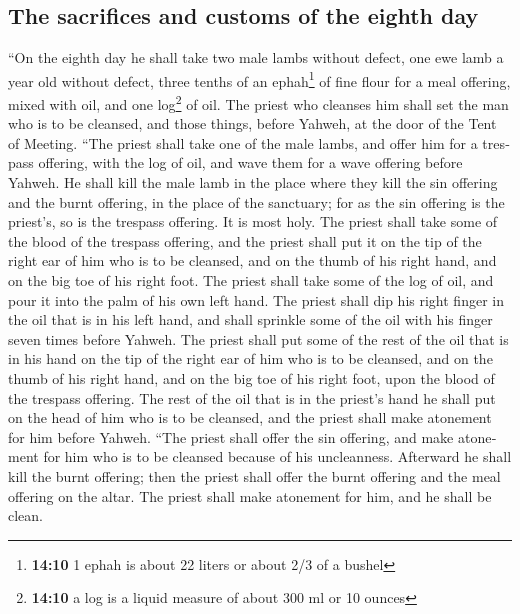 \begin{paracol}{2}
\begin{otherlanguage}{english}
\hypertarget{the-sacrifices-and-customs-of-the-eighth-day}{%
\subsection{The sacrifices and customs of the eighth
day}\label{the-sacrifices-and-customs-of-the-eighth-day}}

 ``On the eighth day he shall take two male lambs without
defect, one ewe lamb a year old without defect, three tenths of an
ephah\footnote{\textbf{14:10} 1 ephah is about 22 liters or about 2/3 of
  a bushel} of fine flour for a meal offering, mixed with oil, and one
log\footnote{\textbf{14:10} a log is a liquid measure of about 300 ml or
  10 ounces} of oil.  The priest who cleanses him shall
set the man who is to be cleansed, and those things, before Yahweh, at
the door of the Tent of Meeting.  ``The priest shall take
one of the male lambs, and offer him for a trespass offering, with the
log of oil, and wave them for a wave offering before Yahweh.
 He shall kill the male lamb in the place where they kill
the sin offering and the burnt offering, in the place of the sanctuary;
for as the sin offering is the priest's, so is the trespass offering. It
is most holy.  The priest shall take some of the blood of
the trespass offering, and the priest shall put it on the tip of the
right ear of him who is to be cleansed, and on the thumb of his right
hand, and on the big toe of his right foot.  The priest
shall take some of the log of oil, and pour it into the palm of his own
left hand.  The priest shall dip his right finger in the
oil that is in his left hand, and shall sprinkle some of the oil with
his finger seven times before Yahweh.  The priest shall
put some of the rest of the oil that is in his hand on the tip of the
right ear of him who is to be cleansed, and on the thumb of his right
hand, and on the big toe of his right foot, upon the blood of the
trespass offering.  The rest of the oil that is in the
priest's hand he shall put on the head of him who is to be cleansed, and
the priest shall make atonement for him before Yahweh. 
``The priest shall offer the sin offering, and make atonement for him
who is to be cleansed because of his uncleanness. Afterward he shall
kill the burnt offering;  then the priest shall offer the
burnt offering and the meal offering on the altar. The priest shall make
atonement for him, and he shall be clean.


\end{otherlanguage}
\end{paracol}
